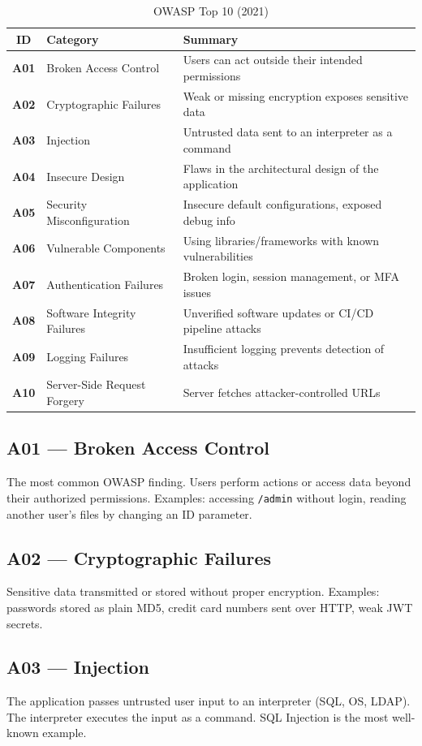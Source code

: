 \begin{table}[H]
\centering
\caption{OWASP Top 10 (2021)}
\begin{tabularx}{\textwidth}{>{\bfseries}clX}
\toprule
ID & Category & Summary \\
\midrule
A01 & Broken Access Control & Users can act outside their intended permissions \\
A02 & Cryptographic Failures & Weak or missing encryption exposes sensitive data \\
A03 & Injection & Untrusted data sent to an interpreter as a command \\
A04 & Insecure Design & Flaws in the architectural design of the application \\
A05 & Security Misconfiguration & Insecure default configurations, exposed debug info \\
A06 & Vulnerable Components & Using libraries/frameworks with known vulnerabilities \\
A07 & Authentication Failures & Broken login, session management, or MFA issues \\
A08 & Software Integrity Failures & Unverified software updates or CI/CD pipeline attacks \\
A09 & Logging Failures & Insufficient logging prevents detection of attacks \\
A10 & Server-Side Request Forgery & Server fetches attacker-controlled URLs \\
\bottomrule
\end{tabularx}
\end{table}

\subsection{A01 --- Broken Access Control}
The most common OWASP finding. Users perform actions or access data beyond their authorized permissions. Examples: accessing \texttt{/admin} without login, reading another user's files by changing an ID parameter.

\subsection{A02 --- Cryptographic Failures}
Sensitive data transmitted or stored without proper encryption. Examples: passwords stored as plain MD5, credit card numbers sent over HTTP, weak JWT secrets.

\subsection{A03 --- Injection}
The application passes untrusted user input to an interpreter (SQL, OS, LDAP). The interpreter executes the input as a command. SQL Injection is the most well-known example.


